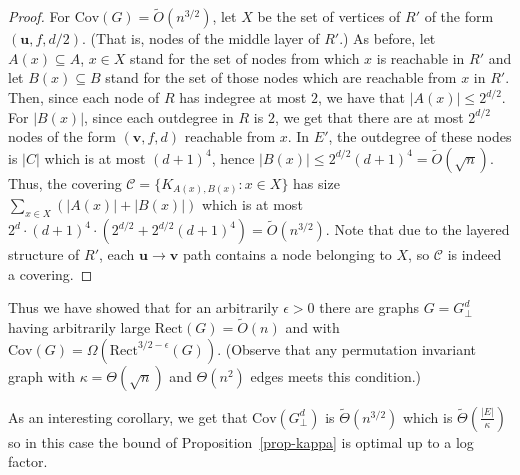 \documentclass[submission]{llncs}
\def\Cov{{\mathrm{Cov}}}
\def\Rect{{\mathrm{Rect}}}
\def\bs#1{{\boldsymbol{#1}}}
\begin{document}
\begin{proof}
  For $\Cov(G)=\tilde{O}(n^{3/2})$, let $X$ be the set of vertices of $R'$ of the form $(\bs{u},f,d/2)$. (That is, nodes of the middle layer of $R'$.)
  As before, let $A(x)\subseteq A$, $x\in X$ stand for the set of nodes from which $x$ is reachable in $R'$ and let $B(x)\subseteq B$ stand
  for the set of those nodes which are reachable from $x$ in $R'$.
  Then, since each node of $R$ has indegree at most $2$, we have that $|A(x)|\leq 2^{d/2}$. For $|B(x)|$, since each outdegree in $R$ is $2$,
  we get that there are at most $2^{d/2}$ nodes of the form $(\bs{v},f,d)$ reachable from $x$. In $E'$, the
  outdegree of these nodes is $|C|$ which is at most $(d+1)^{4}$, hence $|B(x)|\leq 2^{d/2}(d+1)^4=\tilde{O}(\sqrt{n})$.
  Thus, the covering $\mathcal{C}=\{K_{A(x),B(x)}:x\in X\}$ has size $\sum_{x\in X}(|A(x)|+|B(x)|)$ which is at most
  $2^d\cdot (d+1)^4\cdot(2^{d/2}+2^{d/2}(d+1)^4)=\tilde{O}(n^{3/2})$. Note that due to the layered structure of $R'$, each $\bs{u}\to\bs{v}$ path
  contains a node belonging to $X$, so $\mathcal{C}$ is indeed a covering.
  \end{proof}

  Thus we have showed that for an arbitrarily $\epsilon>0$ there are graphs $G=G_\bot^d$ having arbitrarily large $\Rect(G)=\tilde{O}(n)$ and with $\Cov(G)=\Omega(\Rect^{3/2-\epsilon}(G))$.
  (Observe that any permutation invariant graph with $\kappa=\Theta(\sqrt{n})$ and $\Theta(n^2)$ edges meets this condition.)

  As an interesting corollary, we get that $\Cov(G_\bot^d)$ is $\tilde{\Theta}(n^{3/2})$ which is $\tilde{\Theta}(\frac{|E|}{\kappa})$
so in this case the bound of Proposition~\ref{prop-kappa} is optimal up to a log factor.
\end{document}
